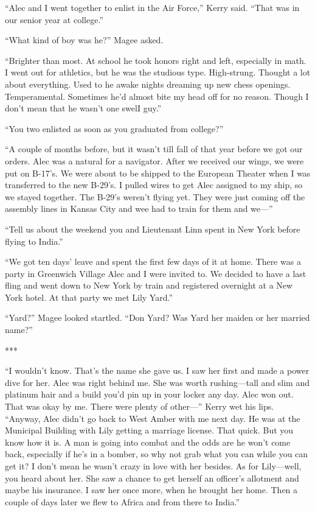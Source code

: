 \documentclass{novel}
\begin{document}
“Alec and I went together to enlist in the Air Force,” Kerry said. “That was in our senior year at college.”

“What kind of boy was he?” Magee asked.

“Brighter than most. At school he took honors right and left, especially in math. I went out for athletics, but he was the studious type. High-strung. Thought a lot about everything. Used to he awake nights dreaming up new chess openings. Temperamental. Sometimes he’d almost bite my head off for no reason. Though I don’t mean that he wasn’t one swelI guy.”

“You two enlisted as soon as you graduated from college?”

“A couple of months before, but it wasn’t till fall of that year before we got our orders. Alec was a natural for a navigator. After we received our wings, we were put on B-17’s. We were about to be shipped to the European Theater when I was transferred to the new B-29’s. I pulled wires to get Alec assigned to my ship, so we stayed together. The B-29’s weren’t flying yet. They were just coming off the assembly lines in Kansas City and wee had to train for them and we—”

“Tell us about the weekend you and Lieutenant Linn spent in New York before flying to India.”

“We got ten days’ leave and spent the first few days of it at home. There was a party in Greenwich Village Alec and I were invited to. We decided to have a last fling and went down to New York by train and registered overnight at a New York hotel. At that party we met Lily Yard.”

“Yard?” Magee looked startled. “Don Yard? Was Yard her maiden or her married name?”

***

“I wouldn’t know. That’s the name she gave us. I saw her first and made a power dive for her. Alec was right behind me. She was worth rushing—tall and slim and platinum hair and a build you’d pin up in your locker any day. Alec won out. That was okay by me. There were plenty of other—” Kerry wet his lips. “Anyway, Alec didn’t go back to West Amber with me next day. He was at the Municipal Building with Lily getting a marriage license. That quick. But you know how it is. A man is going into combat and the odds are he won’t come back, especially if he’s in a bomber, so why not grab what you can while you can get it? I don’t mean he wasn’t crazy in love with her besides. As for Lily—well, you heard about her. She saw a chance to get herself an officer’s allotment and maybe his insurance. I saw her once more, when he brought her home. Then a couple of days later we flew to Africa and from there to India.”
\end{document}
